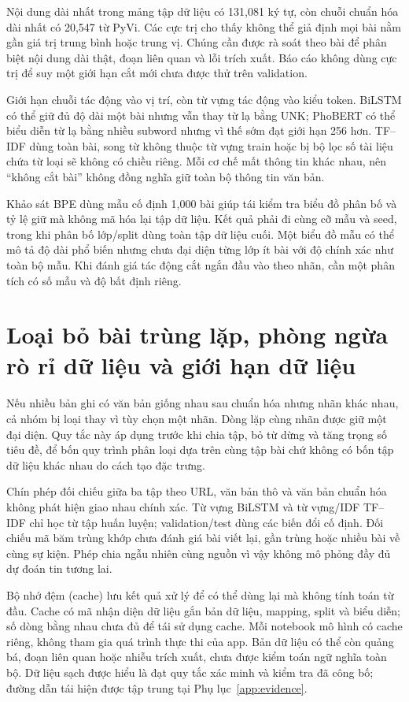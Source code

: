 \FloatBarrier


Nội dung dài nhất trong mảng tập dữ liệu có 131,081 ký tự, còn chuỗi chuẩn hóa dài nhất có 20,547 từ PyVi. Các cực trị cho thấy không thể giả định mọi bài nằm gần giá trị trung bình hoặc trung vị. Chúng cần được rà soát theo bài để phân biệt nội dung dài thật, đoạn liên quan và lỗi trích xuất. Báo cáo không dùng cực trị để suy một giới hạn cắt mới chưa được thử trên validation.

Giới hạn chuỗi tác động vào vị trí, còn từ vựng tác động vào kiểu token. BiLSTM có thể giữ đủ độ dài một bài nhưng vẫn thay từ lạ bằng UNK; PhoBERT có thể biểu diễn từ lạ bằng nhiều subword nhưng vì thế sớm đạt giới hạn 256 hơn. TF--IDF dùng toàn bài, song từ không thuộc từ vựng train hoặc bị bộ lọc số tài liệu chứa từ loại sẽ không có chiều riêng. Mỗi cơ chế mất thông tin khác nhau, nên ``không cắt bài'' không đồng nghĩa giữ toàn bộ thông tin văn bản.

Khảo sát BPE dùng mẫu cố định 1,000 bài giúp tái kiểm tra biểu đồ phân bố và tỷ lệ giữ mà không mã hóa lại tập dữ liệu. Kết quả phải đi cùng cỡ mẫu và seed, trong khi phân bố lớp/split dùng toàn tập dữ liệu cuối. Một biểu đồ mẫu có thể mô tả độ dài phổ biến nhưng chưa đại diện từng lớp ít bài với độ chính xác như toàn bộ mẫu. Khi đánh giá tác động cắt ngắn đầu vào theo nhãn, cần một phân tích có số mẫu và độ bất định riêng.


\section{Loại bỏ bài trùng lặp, phòng ngừa rò rỉ dữ liệu và giới hạn dữ liệu}
Nếu nhiều bản ghi có văn bản giống nhau sau chuẩn hóa nhưng nhãn khác nhau, cả nhóm bị loại thay vì tùy chọn một nhãn. Dòng lặp cùng nhãn được giữ một đại diện. Quy tắc này áp dụng trước khi chia tập, bỏ từ dừng và tăng trọng số tiêu đề, để bốn quy trình phân loại dựa trên cùng tập bài chứ không có bốn tập dữ liệu khác nhau do cách tạo đặc trưng.

Chín phép đối chiếu giữa ba tập theo URL, văn bản thô và văn bản chuẩn hóa không phát hiện giao nhau chính xác. Từ vựng BiLSTM và từ vựng/IDF TF--IDF chỉ học từ tập huấn luyện; validation/test dùng các biến đổi cố định. Đối chiếu mã băm trùng khớp chưa đánh giá bài viết lại, gần trùng hoặc nhiều bài về cùng sự kiện. Phép chia ngẫu nhiên cùng nguồn vì vậy không mô phỏng đầy đủ dự đoán tin tương lai.

Bộ nhớ đệm (cache) lưu kết quả xử lý để có thể dùng lại mà không tính toán từ đầu. Cache có mã nhận diện dữ liệu gắn bản dữ liệu, mapping, split và biểu diễn; số dòng bằng nhau chưa đủ để tái sử dụng cache. Mỗi notebook mô hình có cache riêng, không tham gia quá trình thực thi của app. Bản dữ liệu có thể còn quảng bá, đoạn liên quan hoặc nhiễu trích xuất, chưa được kiểm toán ngữ nghĩa toàn bộ. Dữ liệu sạch được hiểu là đạt quy tắc xác minh và kiểm tra đã công bố; đường dẫn tái hiện được tập trung tại Phụ lục~\ref{app:evidence}.
